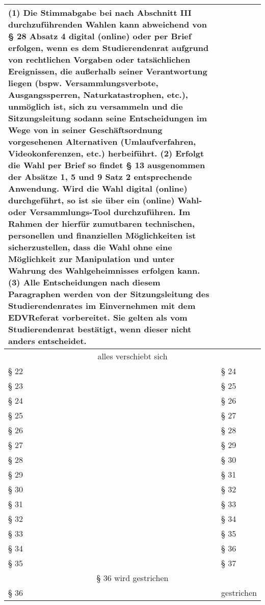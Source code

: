 {\begin{longtable}{|p{7.5cm}|p{7.5cm}|}
        (1) Die Stimmabgabe bei nach Abschnitt III durchzuführenden Wahlen kann abweichend von § 28 Absatz 4 digital (online) oder per Brief erfolgen, wenn es dem Studierendenrat aufgrund von rechtlichen Vorgaben oder tatsächlichen Ereignissen, die außerhalb seiner Verantwortung liegen (bspw. Versammlungsverbote, Ausgangssperren, Naturkatastrophen, etc.), unmöglich ist, sich zu versammeln und die Sitzungsleitung sodann seine Entscheidungen im Wege von in seiner Geschäftsordnung vorgesehenen Alternativen (Umlaufverfahren, Videokonferenzen, etc.) herbeiführt.\newline
        (2) Erfolgt die Wahl per Brief so findet § 13 ausgenommen der Absätze 1, 5 und 9 Satz 2 entsprechende Anwendung. Wird die Wahl digital (online) durchgeführt, so ist sie über ein (online) Wahl- oder Versammlungs-Tool durchzuführen. Im Rahmen der hierfür zumutbaren technischen, personellen und finanziellen Möglichkeiten ist sicherzustellen, dass die Wahl ohne eine Möglichkeit zur Manipulation und unter Wahrung des Wahlgeheimnisses erfolgen kann.\newline
        (3) Alle Entscheidungen nach diesem Paragraphen werden von der Sitzungsleitung des Studierendenrates im Einvernehmen mit dem EDVReferat vorbereitet. Sie gelten als vom Studierendenrat bestätigt, wenn dieser nicht anders entscheidet.\newline
        & \\\hline
        \multicolumn{2}{|c|}{alles verschiebt sich}\\\hline
        § 22 & § 24 \\
        § 23 & § 25 \\
        § 24 & § 26 \\
        § 25 & § 27 \\
        § 26 & § 28 \\
        § 27 & § 29 \\
        § 28 & § 30 \\
        § 29 & § 31 \\
        § 30 & § 32 \\
        § 31 & § 33 \\
        § 32 & § 34 \\
        § 33 & § 35 \\
        § 34 & § 36 \\
        § 35 & § 37 \\\hline
        \multicolumn{2}{|c|}{§ 36 wird gestrichen}\\\hline
        § 36 & gestrichen \\

\end{longtable}}
